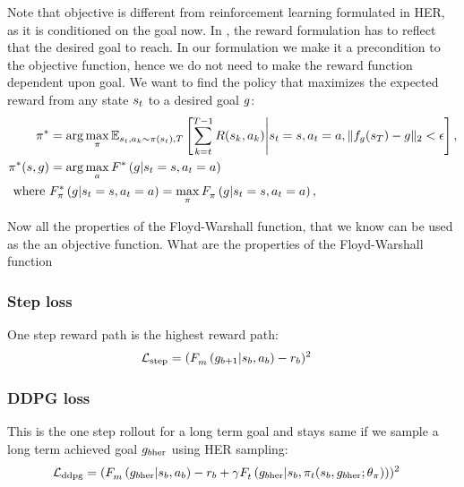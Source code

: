 Note that objective is different from reinforcement learning formulated in HER,
as it is conditioned on the goal now. In \citet{andrychowicz2016learning}, the
reward formulation has to reflect that the desired goal to reach. In our formulation
we make it a precondition to the objective function, hence we do not need to
make the reward function dependent upon goal.
We want to find the policy that maximizes the expected reward from any
state $\state_t$ to a desired goal $\goal$:
%
\begin{align}
  \policy^* &=
\arg \max_{\policy} \E_{\state_t, \act_k \sim \policy(\state_t), T}\left[ \sum_{k=t}^{T-1} \Rew(\state_k, \act_k) \middle\vert \state_t = \state, \act_t = \act, \|f_\goal(\state_T) - \goal\|_2 < \epsilon \right],
  \\
  \policy^*(\state, \goal) &= \arg \max_{\act} \fwargs{\state_t = \state}{\act_t = \act}{\goal}{}{*}\\
\text{where } &\fwargs{\state_t = \state}{\act_t = \act}{\goal}{\policy}{*} = 
\max_{\policy} \fwargs{\state_t = \state}{\act_t = \act}{\goal}{\policy}{},
\end{align}%
%

Now all the properties of the Floyd-Warshall function, that we know can be used
as the an objective function.
What are the properties of the Floyd-Warshall
function

\subsubsection{Step loss}
One step reward path is the highest reward path:
\begin{align}
      \Loss_{\text{step}} &= (\fwargs{\state_{b}}{\act_{b}}{\goal_{b+1}}{m}{} - \rew_b)^2
\end{align}
%

\subsubsection{DDPG loss}
This is the one step rollout for a long term goal and stays same if we sample a
long term achieved goal $\goal_{b\text{her}}$ using HER sampling:
\begin{align}
  \Loss_{\text{ddpg}} &= (\fwargs{\state_{b}}{\act_{b}}{\goal_{b\text{her}}}{m}{} -
      \rew_b + \discount\fwargs{\state_{b}}{\policy_t(\state_b, \goal_{b\text{her}};\param_\policy)}{\goal_{b\text{her}}}{t}{})^2
\end{align}
%

